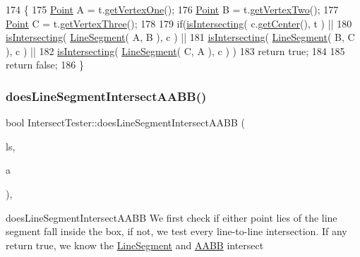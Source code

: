 \begin{DoxyCode}
174 \{
175     \hyperlink{class_point}{Point} A = t.\hyperlink{class_triangle_a88a35d0b66c9636a9be88adc88d003aa}{getVertexOne}();
176     \hyperlink{class_point}{Point} B = t.\hyperlink{class_triangle_ac1ae7463f829bcf377fd926b1ad10cac}{getVertexTwo}();
177     \hyperlink{class_point}{Point} C = t.\hyperlink{class_triangle_aed6ceca804b35da95d3d3c930de41e91}{getVertexThree}();
178 
179     \textcolor{keywordflow}{if}(\hyperlink{class_intersect_tester_a7710e17ff7d2e229059f23b9429213f5}{isIntersecting}( c.\hyperlink{class_circle_a9818ca0bbac64ff447945a8e51ff9319}{getCenter}(), t ) ||
180        \hyperlink{class_intersect_tester_a7710e17ff7d2e229059f23b9429213f5}{isIntersecting}( \hyperlink{class_line_segment}{LineSegment}( A, B ), c ) ||
181        \hyperlink{class_intersect_tester_a7710e17ff7d2e229059f23b9429213f5}{isIntersecting}( \hyperlink{class_line_segment}{LineSegment}( B, C ), c ) ||
182        \hyperlink{class_intersect_tester_a7710e17ff7d2e229059f23b9429213f5}{isIntersecting}( \hyperlink{class_line_segment}{LineSegment}( C, A ), c ) )
183         \textcolor{keywordflow}{return} \textcolor{keyword}{true};
184 
185     \textcolor{keywordflow}{return} \textcolor{keyword}{false};
186 \}
\end{DoxyCode}
\mbox{\label{class_intersect_tester_a817105ec3f73e20066121d7d9d85a3ae}} 
\subsubsection{\texorpdfstring{does\+Line\+Segment\+Intersect\+A\+A\+B\+B()}{doesLineSegmentIntersectAABB()}}
{\footnotesize\ttfamily bool Intersect\+Tester\+::does\+Line\+Segment\+Intersect\+A\+A\+BB (\begin{DoxyParamCaption}\item[{\hyperlink{class_line_segment}{Line\+Segment}}]{ls,  }\item[{\hyperlink{class_a_a_b_b}{A\+A\+BB}}]{a }\end{DoxyParamCaption})\hspace{0.3cm}{\ttfamily [static]}, {\ttfamily [private]}}



does\+Line\+Segment\+Intersect\+A\+A\+BB We first check if either point lies of the line segment fall inside the box, if not, we test every line-\/to-\/line intersection. If any return true, we know the \hyperlink{class_line_segment}{Line\+Segment} and \hyperlink{class_a_a_b_b}{A\+A\+BB} intersect 


